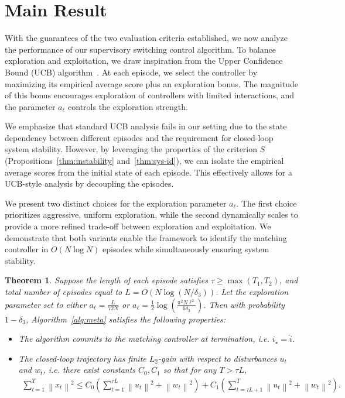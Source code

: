 \documentclass[11pt, twoside]{article}
\newcounter{criteria}
\newtheorem{theorem}{Theorem}
\theoremstyle{definition}
\newcommand{\norm}[1]{\left\lVert #1 \right\rVert}
\begin{document}
\section{Main Result}
With the guarantees of the two evaluation criteria established, we now analyze the performance of our supervisory switching control algorithm.
To balance exploration and exploitation, we draw inspiration from the Upper Confidence Bound (UCB) algorithm~\cite{auer2002finite,audibert2010best}.
At each episode, we select the controller by maximizing its empirical average score plus an exploration bonus.
The magnitude of this bonus encourages exploration of controllers with limited interactions, and the parameter $a_\ell$ controls the exploration strength.

We emphasize that standard UCB analysis fails in our setting due to the state dependency between different episodes and the requirement for closed-loop system stability.
However, by leveraging the properties of the criterion $S$ (Propositions~\ref{thm:instability} and~\ref{thm:sys-id}), we can isolate the empirical average scores from the initial state of each episode.
This effectively allows for a UCB-style analysis by decoupling the episodes.

We present two distinct choices for the exploration parameter $a_\ell$.
The first choice prioritizes aggressive, uniform exploration, while the second dynamically scales to provide a more refined trade-off between exploration and exploitation.
We demonstrate that both variants enable the framework to identify the matching controller in $O(N \log N)$ episodes while simultaneously ensuring system stability.

\begin{theorem}
\label{thm:ucb-unified}
    Suppose the length of each episode satisfies $\tau \ge \max(T_1, T_2)$, and total number of episodes equal to $L = O(N \log (N/\delta_3))$.
    Let the exploration parameter set to either $a_\ell = \frac{L}{72N}$ or $a_\ell = \frac{1}{2} \log(\frac{\pi^2 N \ell^2}{6\delta_3})$.
    Then with probability $1-\delta_3$, Algorithm~\ref{alg:meta} satisfies the following properties:
    \begin{itemize}[wide, labelindent=3pt]
    \item The algorithm commits to the matching controller at termination, i.e. $i_\star = \hat{i}$.
    \item The closed-loop trajectory has finite $L_2$-gain with respect to disturbances $u_t$ and $w_t$, i.e. there exist constants $C_0, C_1$ so that for any $T > \tau L$,
    \begin{align*} 
        \sum_{t=1}^T \norm{x_t}^2 
        \le C_0 \left(\sum_{t=1}^{\tau L} \norm{u_t}^2 + \norm{w_t}^2\right)
        + C_1 \left(\sum_{t=\tau L + 1}^T \norm{u_t}^2 + \norm{w_t}^2\right).
    \end{align*}
    \end{itemize}
\end{theorem}
\end{document}
